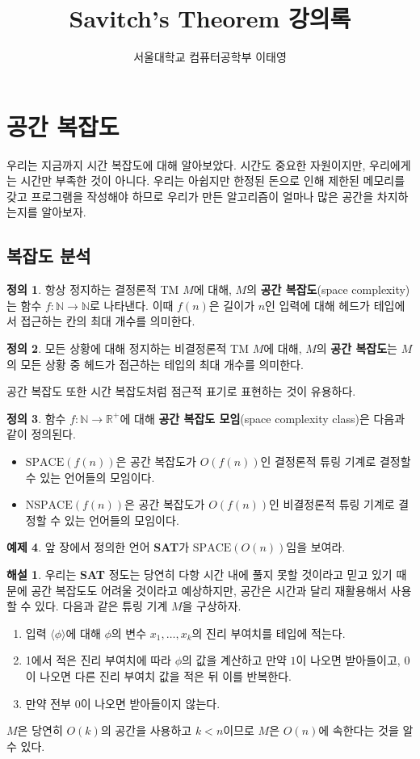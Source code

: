 \documentclass[a4paper, 11pt]{article}
\title{\bfseries Savitch's Theorem 강의록}
\author{서울대학교 컴퓨터공학부 이태영}
\date{}
\theoremstyle{definition}
\newtheorem{defn}{정의}[section]
\newtheorem{ex}[defn]{예제}
\newtheorem*{ans*}{해설}
\begin{document}
\maketitle
\setcounter{section}{6}
\section{공간 복잡도}
우리는 지금까지 시간 복잡도에 대해 알아보았다. 시간도 중요한 자원이지만, 우리에게는 시간만 부족한 것이 아니다. 우리는 아쉽지만 한정된 돈으로 인해 제한된 메모리를 갖고 프로그램을 작성해야 하므로 우리가 만든 알고리즘이 얼마나 많은 공간을 차지하는지를 알아보자.
\subsection{복잡도 분석}
\begin{defn}
    항상 정지하는 결정론적 TM $M$에 대해, $M$의 \textbf{공간 복잡도}(space complexity)는 함수 $f: \mathbb{N} \rightarrow \mathbb{N}$로 나타낸다. 이때 $f(n)$은 길이가 $n$인 입력에 대해 헤드가 테입에서 접근하는 칸의 최대 개수를 의미한다.
\end{defn}
\begin{defn}
    모든 상황에 대해 정지하는 비결정론적 TM $M$에 대해, $M$의 \textbf{공간 복잡도}는 $M$의 모든 상황 중 헤드가 접근하는 테입의 최대 개수를 의미한다.
\end{defn}
공간 복잡도 또한 시간 복잡도처럼 점근적 표기로 표현하는 것이 유용하다.
\begin{defn}
    함수 $f : \mathbb{N} \rightarrow \mathbb{R}^+$에 대해 \textbf{공간 복잡도 모임}(space complexity class)은 다음과 같이 정의된다.
    \begin{itemize}
        \item $\text{SPACE}(f(n))$은 공간 복잡도가 $O(f(n))$인 결정론적 튜링 기계로 결정할 수 있는 언어들의 모임이다.
        \item $\text{NSPACE}(f(n))$은 공간 복잡도가 $O(f(n))$인 비결정론적 튜링 기계로 결정할 수 있는 언어들의 모임이다.
    \end{itemize}
\end{defn}
\begin{ex}
    앞 장에서 정의한 언어 \textbf{SAT}가 $\text{SPACE}(O(n))$임을 보여라.
\end{ex}
\begin{ans*}
    우리는 \textbf{SAT} 정도는 당연히 다항 시간 내에 풀지 못할 것이라고 믿고 있기 때문에 공간 복잡도도 어려울 것이라고 예상하지만, 공간은 시간과 달리 재활용해서 사용할 수 있다. 다음과 같은 튜링 기계 $M$을 구상하자.
    \begin{enumerate}
        \item 입력 $\langle \phi \rangle$에 대해 $\phi$의 변수 $x_1, \ldots, x_k$의 진리 부여치를 테입에 적는다.
        \item 1에서 적은 진리 부여치에 따라 $\phi$의 값을 계산하고 만약 $1$이 나오면 받아들이고, 0이 나오면 다른 진리 부여치 값을 적은 뒤 이를 반복한다.
        \item 만약 전부 0이 나오면 받아들이지 않는다.
    \end{enumerate}
    $M$은 당연히 $O(k)$의 공간을 사용하고 $k<n$이므로 $M$은 $O(n)$에 속한다는 것을 알 수 있다.
\end{ans*}
\end{document}
